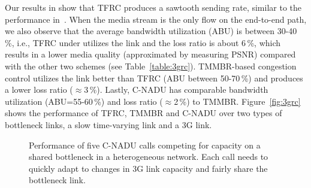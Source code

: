 Our results in  show that TFRC produces a sawtooth sending
rate, similar to the performance in~\cite{saurin:2006:thesis}. When the media
stream is the only flow on the end-to-end path, we also observe that the average
bandwidth utilization (ABU) is between 30-40\,\%, i.e., TFRC under utilizes the
link and the loss ratio is about 6\,\%, which results in a lower media quality
(approximated by measuring PSNR) compared with the other two schemes (see
Table~\ref{table:3grc}). TMMBR-based congestion control utilizes the link
better than TFRC (ABU between 50-70\,\%) and produces a lower loss ratio
($\approx$3\,\%). Lastly, C-NADU has comparable bandwidth utilization
(ABU=55-60\,\%) and loss ratio ($\approx$2\,\%) to TMMBR.
Figure~\ref{fig:3grc} shows the performance of TFRC, TMMBR and C-NADU over two
types of bottleneck links, a slow time-varying link and a 3G link.


\begin{figure}[!t]
\centerline{
{}
{}
}
\centerline{
{}
{}
}
\caption{Performance of five C-NADU calls competing for
capacity on a shared bottleneck in a heterogeneous network. Each call needs
to quickly adapt to changes in 3G link capacity and fairly share the
bottleneck link.}
\label{fig:hetrc}
\end{figure}

\begin{table}[!t]
\caption{C-NADU: Five calls in a heterogeneous network with end-to-end latency
between 60-120\,\emph{ms} and 0.5\,\% link-layer losses.}
\label{table:hetrc}
\end{table}

